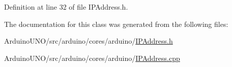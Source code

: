 Definition at line 32 of file I\+P\+Address.\+h.



The documentation for this class was generated from the following files\+:\begin{DoxyCompactItemize}
\item 
Arduino\+U\+N\+O/src/arduino/cores/arduino/\hyperlink{_i_p_address_8h}{I\+P\+Address.\+h}\item 
Arduino\+U\+N\+O/src/arduino/cores/arduino/\hyperlink{_i_p_address_8cpp}{I\+P\+Address.\+cpp}\end{DoxyCompactItemize}
